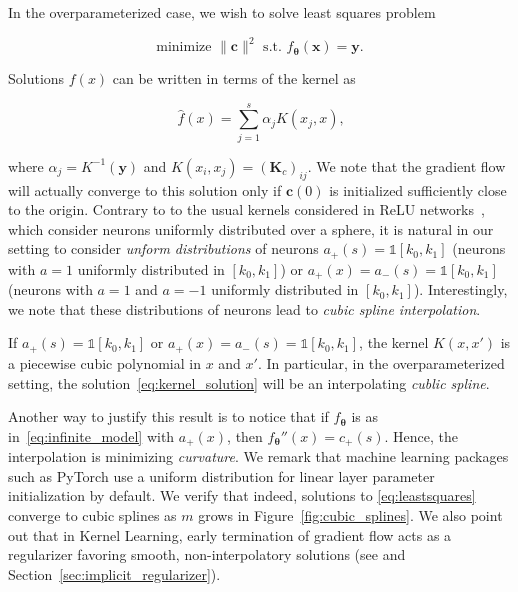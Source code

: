 In the overparameterized case, we wish to solve least squares problem

\begin{equation}\label{eq:least_squares_op}
    \text{minimize } \|\bm c\|^2 \text{ s.t. } f_{\bm \theta}(\bm x) = \bm y.
\end{equation}

Solutions $f(x)$ can be written in terms of the kernel as

\begin{equation}~\label{eq:kernel_solution}
    \hat f(x) = \sum_{j=1}^s \alpha_j K(x_j,x),
\end{equation}

where $\alpha_j = K^{-1}(\bm y)$ and $K(x_i, x_j) = (\bm K_{c})_{ij}$. We note that the gradient flow will actually converge to this solution only if $\bm c(0)$ is initialized sufficiently close to the origin. Contrary to to the usual kernels considered in ReLU networks~\cite{cho2009kernel,bach2017breaking}, which consider neurons uniformly distributed over a sphere, it is natural in our setting to consider \emph{unform distributions} of neurons $a_+(s) = \mathds 1[k_0,k_1]$ (neurons with $a=1$ uniformly distributed in $[k_0, k_1]$) or $a_+(x) = a_-(s) = \mathds 1[k_0,k_1]$ (neurons with $a=1$ and $a=-1$ uniformly distributed in $[k_0, k_1]$). Interestingly, we note that these distributions of neurons lead to \emph{cubic spline interpolation}.

\begin{proposition} If $a_+(s) = \mathds 1[k_0,k_1]$ or $a_+(x) = a_-(s) = \mathds 1[k_0,k_1]$, the kernel $K(x,x')$ is a piecewise cubic polynomial in $x$ and $x'$. In particular, in the overparameterized setting, the solution~\eqref{eq:kernel_solution} will be an interpolating \emph{cublic spline}.
\end{proposition}

Another way to justify this result is to notice that if $f_{\bm \theta}$ is as in~\eqref{eq:infinite_model} with $a_+(x)$, then $f_{\bm \theta}''(x) = c_+(s)$. Hence, the interpolation is minimizing \emph{curvature}.
We remark that machine learning packages such as PyTorch use a uniform distribution for linear layer parameter initialization by default.
We verify that indeed, solutions to \eqref{eq:leastsquares} converge to cubic splines as $m$ grows in Figure~\ref{fig:cubic_splines}. We also point out that in Kernel Learning, early termination of gradient flow acts as a regularizer favoring smooth, non-interpolatory solutions (see \cite{NTKJacot} and Section~\ref{sec:implicit_regularizer}).



